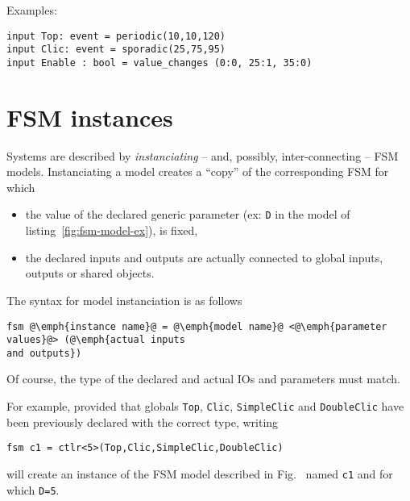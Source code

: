 Examples:

\begin{lstlisting}[language=Rfsm,frame=single,basicstyle=\small]
input Top: event = periodic(10,10,120)
input Clic: event = sporadic(25,75,95)
input Enable : bool = value_changes (0:0, 25:1, 35:0)
\end{lstlisting}

\section{FSM instances}
\label{sec:fsm-instances}

Systems are described by \emph{instanciating} -- and, possibly, inter-connecting -- FSM
models. Instanciating a model creates a ``copy'' of the corresponding FSM for which
\begin{itemize}
\item the value of the declared generic parameter (ex: \verb|D| in the model of
  listing~\ref{fig:fsm-model-ex}), is fixed,
\item the declared inputs and outputs are actually connected to global inputs, outputs or shared
  objects.
\end{itemize}

The syntax for model instanciation is as follows

\begin{lstlisting}[language=Rfsm,frame=single,caption=Overall syntax for FSM models]
fsm @\emph{instance name}@ = @\emph{model name}@ <@\emph{parameter values}@> (@\emph{actual inputs
and outputs})
\end{lstlisting}

Of course, the type of the declared and actual IOs and parameters must match.

\medskip
For example, provided that globals \verb|Top|, \verb|Clic|, \verb|SimpleClic| and \verb|DoubleClic|
have been previously declared with the correct type,  writing

\begin{lstlisting}[language=Rfsm,frame=single,basicstyle=\small]
fsm c1 = ctlr<5>(Top,Clic,SimpleClic,DoubleClic)
\end{lstlisting}

will create an instance of the FSM model described in
Fig.~\pageref{fig:fsm-model-ex} named \verb|c1| and for which \verb|D=5|.


